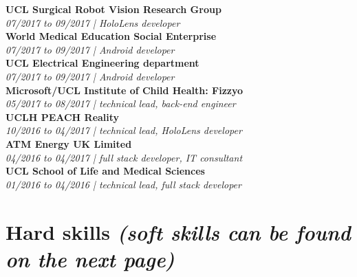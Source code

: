 \documentclass{article}
\begin{document}
\begin{multicols}{2}
\textbf{UCL Surgical Robot Vision Research Group} \\
\emph{\color{gray}07/2017 to 09/2017 | HoloLens developer}
\vspace{2mm}
\\
\textbf{World Medical Education Social Enterprise} \\
\emph{\color{gray}07/2017 to 09/2017 | Android developer}
\vspace{2mm}
\\
\textbf{UCL Electrical Engineering department} \\
\emph{\color{gray}07/2017 to 09/2017 | Android developer}
\vspace{2mm}
\\
\textbf{Microsoft/UCL Institute of Child Health: Fizzyo} \\
\emph{\color{gray} 05/2017 to 08/2017 | technical lead, back-end engineer}
\vspace{2mm}
\\
\textbf{UCLH PEACH Reality} \\
\emph{\color{gray} 10/2016 to 04/2017 | technical lead, HoloLens developer}
\vspace{2mm}
\\
\textbf{ATM Energy UK Limited} \\
\emph{\color{gray} 04/2016 to 04/2017 | full stack developer, IT consultant}
\vspace{2mm}
\\
\textbf{UCL School of Life and Medical Sciences} \\
\emph{\color{gray} 01/2016 to 04/2016 | technical lead, full stack developer}

\columnbreak

\section*{\normalfont Hard skills \emph{\small\color{gray}(soft skills can be found on the next page)}}


\end{multicols}
\end{document}
